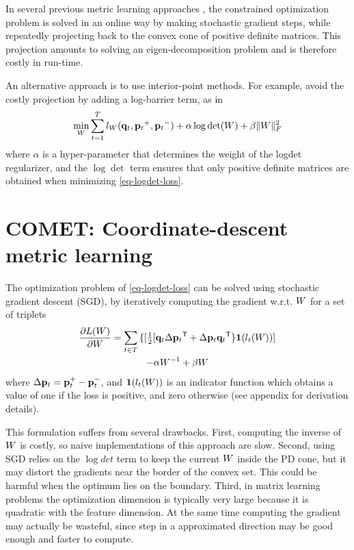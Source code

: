 \documentclass{article}
\begin{document}
In several previous metric learning approaches \cite{pola, others},
the constrained optimization problem is solved in an online way by
making stochastic gradient steps, while repeatedly projecting back to
the convex cone of positive definite matrices. This projection amounts
to solving an eigen-decomposition problem and is therefore costly in
run-time.

An alternative approach is to use interior-point methods. For example,
avoid the costly projection by adding a log-barrier term, as in
\cite{itml}
\begin{equation}
  \min_{{W}} \sum_{{t}=1}^T  l_{{W}}({{\mathbf{q}}_{{t}}}, {{\mathbf{p}}_{{t}}}^+, {{\mathbf{p}}_{{t}}}^-) + \alpha \log \det({W}) + \beta {\|{W}\|_F^2}
\label{eq-logdet-loss}
\end{equation}
where $\alpha$ is a hyper-parameter that determines the weight of the
logdet regularizer, and the $\log \det$ term ensures that only
positive definite matrices are obtained when minimizing
\eqref{eq-logdet-loss}.



\section{COMET: Coordinate-descent metric learning}
The optimization problem of \eqref{eq-logdet-loss} can be solved using
stochastic gradient descent (SGD), by iteratively computing the
gradient w.r.t. ${W}$ for a set of triplets
\begin{multline}
  \frac{\partial {L ({W})}}{\partial {W}} = \sum\limits_{t\in T}{\{
  [\tfrac{1}{2}[{\mathbf{q}}_{t}\Delta{\mathbf{p}}_{t}{}^\mathsf{T} + \Delta{\mathbf{p}}_{t}{\mathbf{q}}_{t}{}^\mathsf{T} \} }
  \textbf{1}(l_t({W}))] \\- \alpha {W}^{-1} + \beta {W}
  \label{gradMtx}
\end{multline}
where $\Delta{\mathbf{p}}_t = {\mathbf{p}}_t^+ - {\mathbf{p}}_t^-$, and $\textbf{1}(l_t({W}))$ is an
indicator function which obtains a value of one if the loss is
positive, and zero otherwise (see appendix for derivation details).

This formulation suffers from several drawbacks. First, computing the
inverse of ${W}$ is costly, so naive implementations of this approach
are slow. Second, using SGD relies on the $\log det$ term to keep the
current ${W}$ inside the PD cone, but it may distort the gradients near
the border of the convex set. This could be harmful when the optimum
lies on the boundary. Third, in matrix learning problems the
optimization dimension is typically very large because it is quadratic
with the feature dimension. At the same time computing the gradient
may actually be wasteful, since step in a approximated direction may
be good enough and faster to compute.
\end{document}
